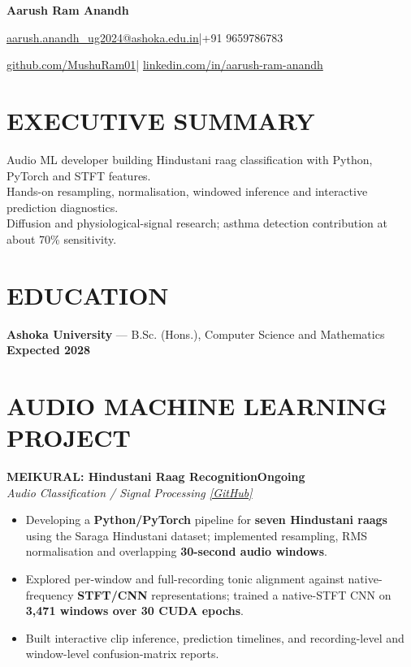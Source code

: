 \documentclass[10pt,a4paper]{article}
\newcommand{\entry}[3]{\noindent\textbf{#1}\hfill\textbf{#3}\\[-1pt]\textit{#2}\par}
\newenvironment{cvitems}{\begin{itemize}[leftmargin=1.1em,label=\textbullet,itemsep=2pt,topsep=3pt,parsep=0pt,partopsep=0pt]}{\end{itemize}}
\begin{document}
{\LARGE\bfseries Aarush Ram Anandh}\par\vspace{4pt}
\href{mailto:aarush.anandh_ug2024@ashoka.edu.in}{aarush.anandh\_ug2024@ashoka.edu.in}\quad|\quad +91 9659786783\par\vspace{2pt}
\href{https://github.com/MushuRam01}{github.com/MushuRam01}\quad|\quad
\href{https://www.linkedin.com/in/aarush-ram-anandh/}{linkedin.com/in/aarush-ram-anandh}\par

\section{EXECUTIVE SUMMARY}
Audio ML developer building Hindustani raag classification with Python, PyTorch and STFT features.\\
Hands-on resampling, normalisation, windowed inference and interactive prediction diagnostics.\\
Diffusion and physiological-signal research; asthma detection contribution at about 70\% sensitivity.\par
\section{EDUCATION}
\textbf{Ashoka University} --- B.Sc. (Hons.), Computer Science and Mathematics \hfill \textbf{Expected 2028}
\section{AUDIO MACHINE LEARNING PROJECT}
\entry{MEIKURAL: Hindustani Raag Recognition}{Audio Classification / Signal Processing \href{https://github.com/MushuRam01/MEIKURAL}{[GitHub]}}{Ongoing}
\begin{cvitems}
  \item Developing a \textbf{Python/PyTorch} pipeline for \textbf{seven Hindustani raags} using the Saraga Hindustani dataset; implemented resampling, RMS normalisation and overlapping \textbf{30-second audio windows}.
  \item Explored per-window and full-recording tonic alignment against native-frequency \textbf{STFT/CNN} representations; trained a native-STFT CNN on \textbf{3,471 windows over 30 CUDA epochs}.
  \item Built interactive clip inference, prediction timelines, and recording-level and window-level confusion-matrix reports.
\end{cvitems}
\end{document}
